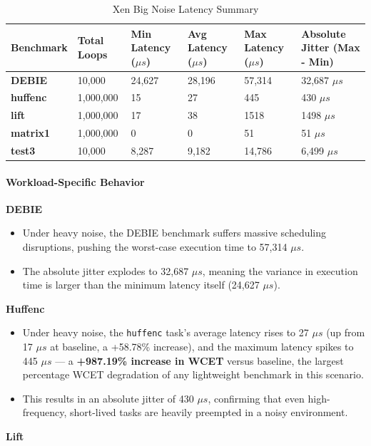 \begin{table}
\centering
\caption{Xen Big Noise Latency Summary}
\label{tab:xen:big-noise}
\begin{tabularx}{\linewidth}{@{}YYYYYY@{}}
\toprule
Benchmark & Total Loops & Min Latency ($\mu s$) & Avg Latency ($\mu s$) & Max Latency ($\mu s$) & Absolute Jitter (Max - Min)\tabularnewline
\midrule
\textbf{DEBIE} & 10,000 & 24,627 & 28,196 & 57,314 & 32,687 $\mu s$\tabularnewline
\textbf{huffenc} & 1,000,000 & 15 & 27 & 445 & 430 $\mu s$\tabularnewline
\textbf{lift} & 1,000,000 & 17 & 38 & 1518 & 1498 $\mu s$\tabularnewline
\textbf{matrix1} & 1,000,000 & 0 & 0 & 51 & 51 $\mu s$\tabularnewline
\textbf{test3} & 10,000 & 8,287 & 9,182 & 14,786 & 6,499 $\mu s$\tabularnewline
\bottomrule
\end{tabularx}
\end{table}

\paragraph{Workload-Specific
Behavior}\label{workload-specific-behavior-6}

\textbf{DEBIE}

\begin{itemize}
\item
  Under heavy noise, the DEBIE benchmark suffers massive scheduling
  disruptions, pushing the worst-case execution time to 57,314 $\mu s$.
\item
  The absolute jitter explodes to 32,687 $\mu s$, meaning the variance in
  execution time is larger than the minimum latency itself (24,627 $\mu s$).
\end{itemize}

\textbf{Huffenc}

\begin{itemize}
\item
  Under heavy noise, the \texttt{huffenc} task's average latency rises
  to 27 $\mu s$ (up from 17 $\mu s$ at baseline, a +58.78\% increase), and the
  maximum latency spikes to 445 $\mu s$ --- a \textbf{+987.19\% increase in
  WCET} versus baseline, the largest percentage WCET degradation of any
  lightweight benchmark in this scenario.
\item
  This results in an absolute jitter of 430 $\mu s$, confirming that even
  high-frequency, short-lived tasks are heavily preempted in a noisy
  environment.
\end{itemize}

\textbf{Lift}

